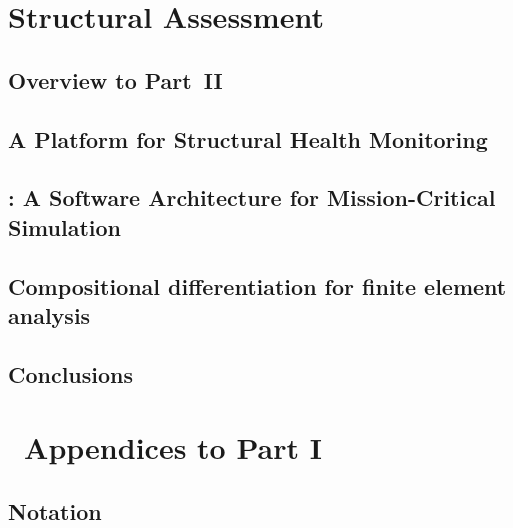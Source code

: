 \begin{Notation}[section]

\clearpage


\part{Structural Assessment}

\chapter{Overview to Part~II}\label{sec:Part-II}

\clearpage


% 


\chapter{A Platform for Structural Health Monitoring}\label{sec:irie}

\clearpage


\chapter[Xara: A Software Architecture for Mission-Critical Simulation]{\Xara{}: 
A Software Architecture for Mission-Critical Simulation
}\label{ch:xara}

\clearpage

\chapter{Compositional differentiation for finite element analysis}
\label{ch:autodiff}

\clearpage




\chapter{Conclusions}

\clearpage

\part{~Appendices to Part I}
\begin{appendices}
\clearpage
\chapter{Notation}\label{sec:notation}


\end{appendices}
\end{Notation}
